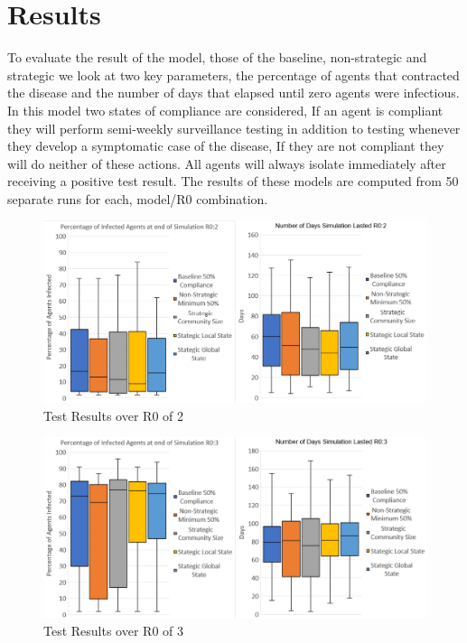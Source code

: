 \documentclass{article}
\begin{document}
\section{Results}

To evaluate the result of the model, those of the baseline, non-strategic and strategic we look at two key parameters, the percentage of agents that contracted the disease and the number of days that elapsed until zero agents were infectious. In this model two states of compliance are considered, If an agent is compliant they will perform semi-weekly surveillance testing in addition to testing whenever they develop a symptomatic case of the disease, If they are not compliant they will do neither of these actions. All agents will always isolate immediately after receiving a positive test result. The results of these models are computed from 50 separate runs for each, model/R0 combination. \newline

\newpage

\begin{figure}[h!]
\centering
\includegraphics[width=\textwidth]{5}
\caption{Test Results over R0 of 2}
\end{figure}

\begin{figure}[h!]
\centering
\includegraphics[width=\textwidth]{4}
\caption{Test Results over R0 of 3}
\end{figure}
\end{document}
